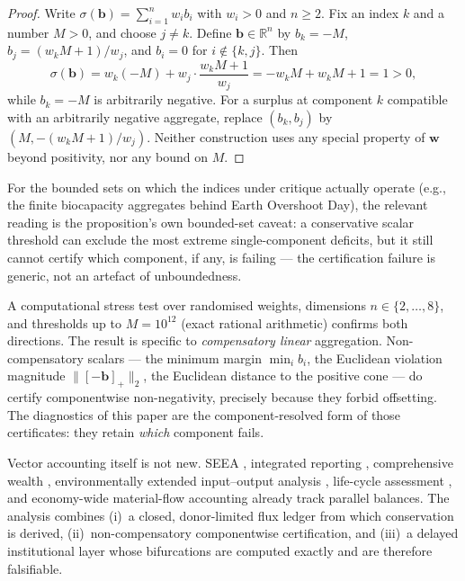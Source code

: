 \documentclass[11pt]{article}
\theoremstyle{definition}
\begin{document}
\begin{proof}
Write $\sigma(\mathbf b)=\sum_{i=1}^n w_i b_i$ with $w_i>0$ and $n\ge 2$. Fix an index $k$ and a number $M>0$, and choose $j\neq k$. Define $\mathbf b\in\mathbb R^n$ by $b_k=-M$, $b_j=(w_k M+1)/w_j$, and $b_i=0$ for $i\notin\{k,j\}$. Then
\[
\sigma(\mathbf b)=w_k(-M)+w_j\cdot\frac{w_k M+1}{w_j}=-w_k M+w_k M+1=1>0,
\]
while $b_k=-M$ is arbitrarily negative. For a surplus at component $k$ compatible with an arbitrarily negative aggregate, replace $(b_k,b_j)$ by $(M,-(w_k M+1)/w_j)$. Neither construction uses any special property of $\mathbf w$ beyond positivity, nor any bound on $M$.
\end{proof}

For the bounded sets on which the indices under critique actually operate (e.g., the finite biocapacity aggregates behind Earth Overshoot Day), the relevant reading is the proposition's own bounded-set caveat: a conservative scalar threshold can exclude the most extreme single-component deficits, but it still cannot certify which component, if any, is failing --- the certification failure is generic, not an artefact of unboundedness.

A computational stress test over randomised weights, dimensions $n\in\{2,\dots,8\}$, and thresholds up to $M=10^{12}$ (exact rational arithmetic) confirms both directions. The result is specific to \emph{compensatory linear} aggregation. Non-compensatory scalars --- the minimum margin $\min_i b_i$, the Euclidean violation magnitude $\|[-\mathbf b]_+\|_2$, the Euclidean distance to the positive cone --- do certify componentwise non-negativity, precisely because they forbid offsetting. The diagnostics of this paper are the component-resolved form of those certificates: they retain \emph{which} component fails.

Vector accounting itself is not new. SEEA \cite{seea2014}, integrated reporting \cite{iirc2013}, comprehensive wealth \cite{cwon2021,dasgupta2021}, environmentally extended input--output analysis \cite{leontief1970}, life-cycle assessment \cite{iso14040}, and economy-wide material-flow accounting \cite{eurostat2001,hoekstra2002} already track parallel balances. The analysis combines (i)~a closed, donor-limited flux ledger from which conservation is derived, (ii)~non-compensatory componentwise certification, and (iii)~a delayed institutional layer whose bifurcations are computed exactly and are therefore falsifiable.
\end{document}
